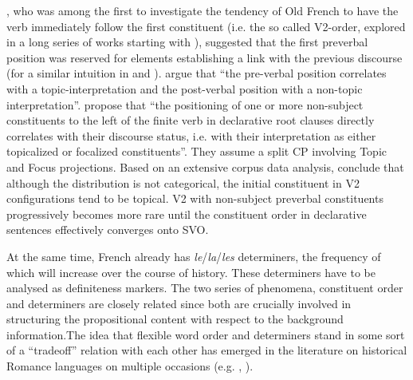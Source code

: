 \documentclass[output=paper,modfonts,nonflat]{langsci/langscibook}
\begin{document}
\citet{MarchelloNizia:1995}, who was among the first to investigate the tendency of Old French to have the verb immediately follow the first constituent (i.e. the so called V2-order, explored in a long series of works starting with \citet{Skarup:1975}), suggested that the first preverbal position was reserved for elements establishing a link with the previous discourse (for a similar intuition in \citet{Vennemann:1974} and \citet{Harris:1978}). \citet[117]{RinkeMeisel:2009} argue that ``the pre-verbal position correlates with a topic-interpretation and the post-verbal position with a non-topic interpretation''. \citet[24]{KaiserZimmermann:2011} propose that ``the positioning of one or more non-subject constituents to the left of the finite verb in declarative root clauses directly correlates with their discourse status, i.e. with their interpretation as either topicalized or focalized constituents''. They assume a split CP involving Topic and Focus projections. Based on an extensive corpus data analysis, \citet{LabelleHirschbuhler:2018} conclude that although the distribution is not categorical, the initial constituent in V2 configurations tend to be topical. V2 with non-subject preverbal constituents progressively becomes more rare until the constituent order in declarative sentences effectively converges onto SVO.



At the same time, French already has {\itshape le}/{\itshape la}/{\itshape les} determiners, the frequency of which will increase over the course of history. These determiners have to be analysed as definiteness markers. The two series of phenomena, constituent order and determiners are closely related since both are crucially involved in structuring the propositional content with respect to the background information.The idea that flexible word order and determiners stand in some sort of a ``tradeoff'' relation with each other has emerged in the literature on historical Romance languages on multiple occasions (e.g. \citet{Vincent:1997}, \citet{Ledgeway:2012}). 
\end{document}
